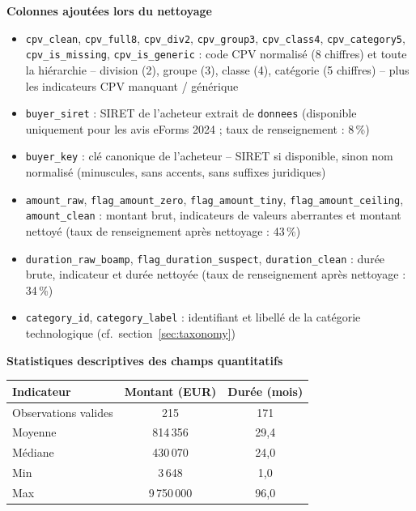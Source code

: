 \documentclass[12pt,a4paper]{article}
\begin{document}
\medskip
\textbf{Colonnes ajoutées lors du nettoyage}

\begin{itemize}
  \item[---] \texttt{cpv\_clean}, \texttt{cpv\_full8}, \texttt{cpv\_div2}, \texttt{cpv\_group3}, \texttt{cpv\_class4}, \texttt{cpv\_category5}, \texttt{cpv\_is\_missing}, \texttt{cpv\_is\_generic} :
    code CPV normalisé (8 chiffres) et toute la hiérarchie -- division (2), groupe (3), classe (4), catégorie (5 chiffres) -- plus les indicateurs CPV manquant / générique
  \item[---] \texttt{buyer\_siret} : SIRET de l'acheteur extrait de
    \texttt{donnees} (disponible uniquement pour les avis eForms 2024 ; taux
    de renseignement : 8\,\%)
  \item[---] \texttt{buyer\_key} : clé canonique de l'acheteur -- SIRET si
    disponible, sinon nom normalisé (minuscules, sans accents, sans suffixes
    juridiques)
  \item[---] \texttt{amount\_raw}, \texttt{flag\_amount\_zero},
    \texttt{flag\_amount\_tiny}, \texttt{flag\_amount\_ceiling},
    \texttt{amount\_clean} : montant brut, indicateurs de valeurs aberrantes
    et montant nettoyé (taux de renseignement après nettoyage : 43\,\%)
  \item[---] \texttt{duration\_raw\_boamp}, \texttt{flag\_duration\_suspect},
    \texttt{duration\_clean} : durée brute, indicateur et durée nettoyée
    (taux de renseignement après nettoyage : 34\,\%)
  \item[---] \texttt{category\_id}, \texttt{category\_label} : identifiant et
    libellé de la catégorie technologique (cf.\ section~\ref{sec:taxonomy})
\end{itemize}

\medskip
\textbf{Statistiques descriptives des champs quantitatifs}

\begin{center}
\begin{tabular}{lcc}
\toprule
\textbf{Indicateur} & \textbf{Montant (EUR)} &
  \textbf{Durée (mois)} \\
\midrule
Observations valides & 215 & 171 \\
Moyenne              & 814\,356 & 29,4 \\
Médiane              & 430\,070 & 24,0 \\
Min                  & 3\,648   & 1,0 \\
Max                  & 9\,750\,000 & 96,0 \\
\bottomrule
\end{tabular}
\end{center}
\end{document}
